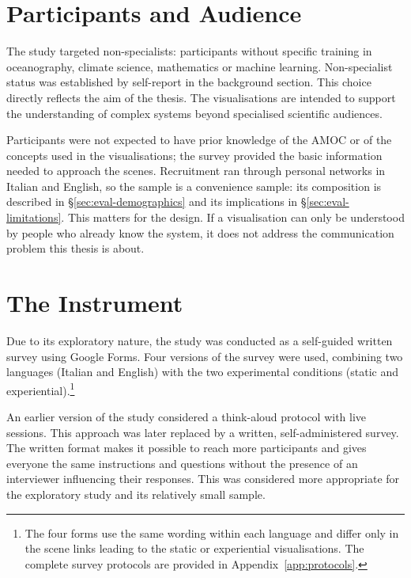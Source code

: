 \section{Participants and Audience}
\label{sec:eval-audience}

The study targeted non-specialists: participants without specific training in oceanography, climate science, mathematics or machine learning. Non-specialist status was established by self-report in the background section. This choice directly reflects the aim of the thesis. The visualisations are intended to support the understanding of complex systems beyond specialised scientific audiences.

Participants were not expected to have prior knowledge of the AMOC or of the concepts used in the visualisations; the survey provided the basic information needed to approach the scenes. Recruitment ran through personal networks in Italian and English, so the sample is a convenience sample: its composition is described in \S\ref{sec:eval-demographics} and its implications in \S\ref{sec:eval-limitations}. This matters for the design. If a visualisation can only be understood by people who already know the system, it does not address the communication problem this thesis is about.

\section{The Instrument}
\label{sec:eval-instrument}

Due to its exploratory nature, the study was conducted as a self-guided written survey using Google Forms. Four versions of the survey were used, combining two languages (Italian and English) with the two experimental conditions (static and experiential).\footnote{The four forms use the same wording within each language and differ only in the scene links leading to the static or experiential visualisations. The complete survey protocols are provided in Appendix~\ref{app:protocols}.}



An earlier version of the study considered a think-aloud protocol with live sessions. This approach was later replaced by a written, self-administered survey. The written format makes it possible to reach more participants and gives everyone the same instructions and questions without the presence of an interviewer influencing their responses. This was considered more appropriate for the exploratory study and its relatively small sample.

